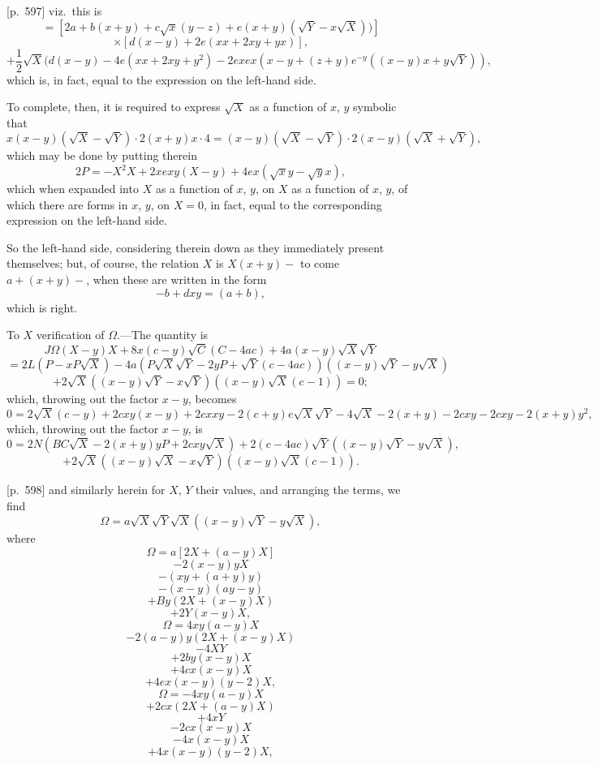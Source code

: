 \documentclass[11pt,a4paper]{article}
\theoremstyle{plain}
\theoremstyle{definition}
\theoremstyle{remark}
\begin{document}
\bigskip

[p.~597] viz.\ this is
\[
= [2a + b(x + y) + c\sqrt{x}(y - z) + e(x + y)(\sqrt{Y} - x\sqrt{X}))]
\]
\[
\times [d(x - y) + 2e(x x + 2xy + y x)],
\]
\[
+ \frac{1}{2}\sqrt{X}(d(x - y) - 4e(x x + 2x y + y^2) - 2ex e x(x - y + (z + y) e^{-y}((x - y)x + y\sqrt{Y})),
\]
which is, in fact, equal to the expression on the left-hand side.

To complete, then, it is required to express $\sqrt{X}$ as a function of $x$, $y$ symbolic that
\[
x(x - y)(\sqrt{X} - \sqrt{Y}) \cdot 2(x + y)x \cdot 4 = (x - y)(\sqrt{X} - \sqrt{Y}) \cdot 2(x - y)(\sqrt{X} + \sqrt{Y}),
\]
which may be done by putting therein
\[
2 P = -X^2 X + 2x ex y (X - y) + 4ex(\sqrt{x} y - \sqrt{y} x),
\]
which when expanded into $X$ as a function of $x$, $y$, on $X$ as a function of $x$, $y$, of which there are forms in $x$, $y$, on $X = 0$, in fact, equal to the corresponding expression on the left-hand side.

So the left-hand side, considering therein down as they immediately present themselves; but, of course, the relation $X$ is $X(x + y) - $ to come $a + (x + y) - $, when these are written in the form
\[
-b + dxy = (a + b),
\]
which is right.

To $X$ verification of $\Omega$.---The quantity is
\[
J\Omega(X - y)X + 8x(c - y)\sqrt{C}(C - 4ac) + 4a(x - y)\sqrt{X}\sqrt{Y}
\]
\[
= 2L(P - x P\sqrt{X}) - 4a(P\sqrt{X}\sqrt{Y} - 2y P + \sqrt{Y}(c - 4ac))((x - y)\sqrt{Y} - y\sqrt{X})
\]
\[
+ 2\sqrt{X}((x - y)\sqrt{Y} - x\sqrt{Y})((x - y)\sqrt{X}(c - 1)) = 0;
\]
which, throwing out the factor $x - y$, becomes
\[
0 = 2\sqrt{X}(c - y) + 2c x y(x - y) + 2c x x y - 2(c + y) e\sqrt{X}\sqrt{Y} - 4 \sqrt{X} - 2(x + y) - 2c x y - 2c x y - 2(x + y) y^2,
\]
which, throwing out the factor $x - y$, is
\[
0 = 2N\left( BC \sqrt{X} - 2(x + y) y P + 2c x y \sqrt{X} \right) + 2(c - 4ac)\sqrt{Y}((x - y)\sqrt{Y} - y \sqrt{X}),
\]
\[
+ 2\sqrt{X}((x - y)\sqrt{X} - x\sqrt{Y})((x - y)\sqrt{X}(c - 1)).
\]

\bigskip

[p.~598] and similarly herein for $X$, $Y$ their values, and arranging the terms, we find
\[
\Omega = a\sqrt{X}\sqrt{Y}\sqrt{X}((x - y)\sqrt{Y} - y\sqrt{X}),
\]
where
\[
\Omega = a [2X + (a - y)X]
\]
\[
- 2(x - y)y X
\]
\[
- (xy + (a + y)y)
\]
\[
- (x - y)(a y - y)
\]
\[
+ By(2X + (x - y)X)
\]
\[
+ 2Y(x - y)X,
\]
\[
\Omega = 4xy(a - y)X
\]
\[
- 2(a - y)y(2X + (x - y)X)
\]
\[
- 4XY
\]
\[
+ 2by(x - y)X
\]
\[
+ 4cx(x - y)X
\]
\[
+ 4ex(x - y)(y - 2)X,
\]
\[
\Omega = -4xy(a - y)X
\]
\[
+ 2cx(2X + (a - y)X)
\]
\[
+ 4xY
\]
\[
- 2cx(x - y)X
\]
\[
- 4x(x - y)X
\]
\[
+ 4x(x - y)(y - 2)X,
\]
\end{document}
